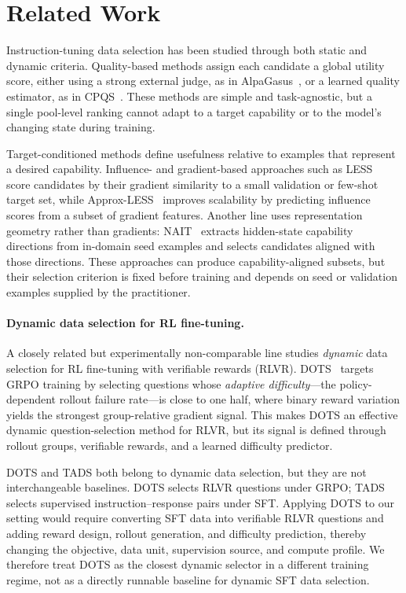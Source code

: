 \section{Related Work}
\label{sec:related}

Instruction-tuning data selection has been studied through both
static and dynamic criteria. Quality-based methods assign each
candidate a global utility score, either using a strong external
judge, as in AlpaGasus~\cite{alpagasus}, or a learned quality
estimator, as in CPQS~\cite{cpqs2026}. These methods are simple and
task-agnostic, but a single pool-level ranking cannot adapt to a
target capability or to the model's changing state during training.

Target-conditioned methods define usefulness relative to examples
that represent a desired capability. Influence- and gradient-based
approaches such as LESS~\cite{less} score candidates by their
gradient similarity to a small validation or few-shot target set,
while Approx-LESS~\cite{approxless} improves scalability by
predicting influence scores from a subset of gradient features.
Another line uses representation geometry rather than gradients:
NAIT~\cite{nait2026} extracts hidden-state capability directions
from in-domain seed examples and selects candidates aligned with
those directions. These approaches can produce capability-aligned
subsets, but their selection criterion is fixed before training and
depends on seed or validation examples supplied by the practitioner.
\paragraph{Dynamic data selection for RL fine-tuning.}
A closely related but experimentally non-comparable line studies
\emph{dynamic} data selection for RL fine-tuning with verifiable
rewards (RLVR). DOTS~\cite{sun2025dots} targets GRPO training by
selecting questions whose \emph{adaptive difficulty}---the
policy-dependent rollout failure rate---is close to one half, where
binary reward variation yields the strongest group-relative gradient
signal. This makes DOTS an effective dynamic question-selection
method for RLVR, but its signal is defined through rollout groups,
verifiable rewards, and a learned difficulty predictor.

DOTS and \textsc{TADS} both belong to dynamic data selection, but
they are not interchangeable baselines. DOTS selects RLVR questions
under GRPO; \textsc{TADS} selects supervised instruction--response
pairs under SFT. Applying DOTS to our setting would require
converting SFT data into verifiable RLVR questions and adding reward
design, rollout generation, and difficulty prediction, thereby
changing the objective, data unit, supervision source, and compute
profile. We therefore treat DOTS as the closest dynamic selector in
a different training regime, not as a directly runnable baseline for
dynamic SFT data selection.


